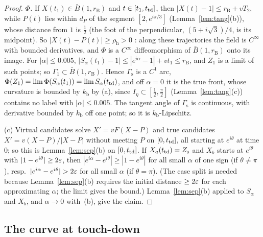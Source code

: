 \begin{proof}
\emph{$\Phi$.} If $X(t_1)\in\bar B(1,r_{\mathrm B})$ and $t\in[t_1,t_{\mathrm{td}}]$, then $|X(t)-1|\le r_{\mathrm B}+vT_2$, while $P(t)$ lies within
$d_P$ of the segment $[2,e^{i\pi/3}]$ (Lemma~\ref{lem:tang}(b)), whose distance from $1$ is $\frac12$ (the foot of the perpendicular,
$(5+i\sqrt3)/4$, is its midpoint). So $|X(t)-P(t)|\ge\rho_{\mathrm h}>0$ : along these trajectories the field is $C^\infty$
with bounded derivatives, and $\Phi$ is a $C^\infty$ diffeomorphism of $\bar B(1,r_{\mathrm B})$ onto its image. For $|\alpha|\le0.005$,
$|S_\alpha(t_1)-1|\le|e^{i\alpha}-1|+vt_1\le r_{\mathrm B}$, and $Z_1$ is a limit of such points; so $\Gamma_1\subset\bar B(1,r_{\mathrm B})$.
Hence $\Gamma_{\mathrm s}$ is a $C^1$ arc, $\Phi(Z_1)=\lim\Phi(S_\alpha(t_1))=\lim S_\alpha(t_{\mathrm{td}})$, and off $\alpha=0$ it is the true
front, whose curvature is bounded by $k_{\mathrm b}$ by (a), since $I_\eta\subset[\frac12,\frac\pi2]$ (Lemma~\ref{lem:tang}(c)) contains no
label with $|\alpha|\le0.005$. The tangent angle of $\Gamma_{\mathrm s}$ is continuous, with derivative bounded by $k_{\mathrm b}$ off one
point; so it is $k_{\mathrm b}$-Lipschitz.

(c) Virtual candidates solve $X'=vF(X-P)$ and true candidates $X'=v(X-P)/|X-P|$ without meeting $P$ on $[0,t_{\mathrm{td}}]$, all starting at
$e^{i\theta}$ at time $0$; so this is Lemma~\ref{lem:sep}(b) on $[0,t_{\mathrm{td}}]$. If $X_a(t_{\mathrm{td}})=Z_{\mathrm s}$ and $X_b$ starts at
$e^{i\theta}$ with $|1-e^{i\theta}|\ge2\varepsilon$, then $|e^{i\alpha}-e^{i\theta}|\ge|1-e^{i\theta}|$ for all small $\alpha$ of one sign (if
$\theta\ne\pi$), resp.\ $|e^{i\alpha}-e^{i\theta}|>2\eps$ for all small $\alpha$ (if $\theta=\pi$). (The case split is needed because
Lemma~\ref{lem:sep}(b) requires the initial distance $\ge2\varepsilon$ for each approximating $\alpha$; the limit gives the bound.)
Lemma~\ref{lem:sep}(b) applied to $S_\alpha$
and $X_b$, and $\alpha\to0$ with~(b), give the claim.
\end{proof}

\subsection{The curve at touch-down}\label{sec:x0}

